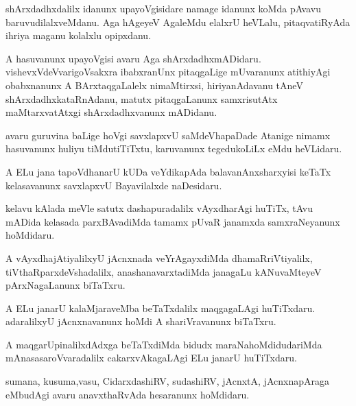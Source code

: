 \documentclass{article}
\begin{document}
\begin{mn}
shArxdadhxdalilx idanunx upayoVgisidare namage idanunx koMda pAvavu
baruvudilalxveMdanu. Aga hAgeyeV AgaleMdu elalxrU heVLalu,
pitaqvatiRyAda ihriya maganu kolalxlu opipxdanu.
\end{mn}

\begin{mn}%
A hasuvanunx upayoVgisi avaru Aga
shArxdadhxmADidaru. vishevxVdeVvarigoVsakxra ibabxranUnx pitaqgaLige
mUvaranunx atithiyAgi obabxnanunx A BArxtaqgaLalelx nimaMtirxsi,
hiriyanAdavanu tAneV shArxdadhxkataRnAdanu, matutx pitaqgaLanunx
samxrisutAtx maMtarxvatAtxgi shArxdadhxvanunx mADidanu.
\end{mn}

\begin{mn}%
avaru guruvina baLige hoVgi savxlapxvU saMdeVhapaDade Atanige nimamx
hasuvanunx huliyu tiMdutiTiTxtu, karuvanunx tegedukoLiLx eMdu heVLidaru.
\end{mn}

\begin{mn}
A ELu jana tapoVdhanarU kUDa veYdikapAda balavanAnxsharxyisi keTaTx
kelasavanunx savxlapxvU Bayavilalxde naDesidaru.
\end{mn}

\begin{mn}
kelavu kAlada meVle satutx dashapuradalilx vAyxdharAgi huTiTx, tAvu
mADida kelasada parxBAvadiMda tamamx pUvaR janamxda samxraNeyanunx hoMdidaru.
\end{mn}

\begin{mn}
A vAyxdhajAtiyalilxyU jAcnxnada veYrAgayxdiMda dhamaRriVtiyalilx,
tiVthaRparxdeVshadalilx, anashanavarxtadiMda janagaLu kANuvaMteyeV
pArxNagaLanunx biTaTxru.
\end{mn}

\begin{mn}
A ELu janarU kalaMjaraveMba beTaTxdalilx maqgagaLAgi
huTiTxdaru. adaralilxyU jAcnxnavanunx hoMdi A shariVravanunx biTaTxru.
\end{mn}

\begin{mn}%
A maqgarUpinalilxdAdxga beTaTxdiMda bidudx maraNahoMdidudariMda
mAnasasaroVvaradalilx cakarxvAkagaLAgi ELu janarU huTiTxdaru.
\end{mn}

\begin{mn}
sumana, kusuma,vasu, CidarxdashiRV, sudashiRV, jAcnxtA, jAcnxnapAraga
eMbudAgi avaru anavxthaRvAda hesaranunx hoMdidaru.
\end{mn}
\end{document}
